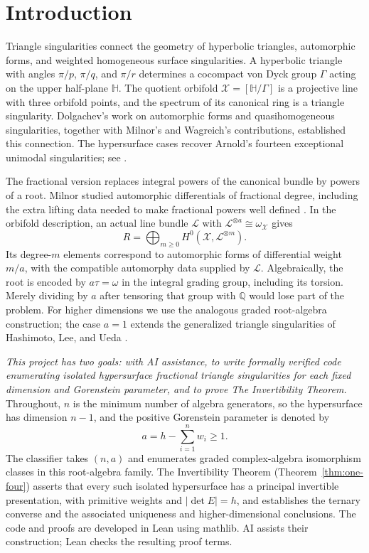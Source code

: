 \section*{Introduction}

Triangle singularities connect the geometry of hyperbolic triangles, automorphic forms, and weighted homogeneous surface singularities. A hyperbolic triangle with angles $\pi/p$, $\pi/q$, and $\pi/r$ determines a cocompact von Dyck group $\Gamma$ acting on the upper half-plane $\mathbb H$. The quotient orbifold $\mathcal X=[\mathbb H/\Gamma]$ is a projective line with three orbifold points, and the spectrum of its canonical ring is a triangle singularity. Dolgachev's work on automorphic forms and quasihomogeneous singularities, together with Milnor's and Wagreich's contributions, established this connection. The hypersurface cases recover Arnold's fourteen exceptional unimodal singularities; see \cite{Dolgachev,Milnor,Wagreich,HLU}.

The fractional version replaces integral powers of the canonical bundle by powers of a root. Milnor studied automorphic differentials of fractional degree, including the extra lifting data needed to make fractional powers well defined \cite[Sections 5--6]{Milnor}. In the orbifold description, an actual line bundle $\mathcal L$ with $\mathcal L^{\otimes a}\cong\omega_{\mathcal X}$ gives
\[
 R=\bigoplus_{m\geq0}H^0(\mathcal X,\mathcal L^{\otimes m}).
\]
Its degree-$m$ elements correspond to automorphic forms of differential weight $m/a$, with the compatible automorphy data supplied by $\mathcal L$. Algebraically, the root is encoded by $a\tau=\omega$ in the integral grading group, including its torsion. Merely dividing by $a$ after tensoring that group with $\mathbb Q$ would lose part of the problem. For higher dimensions we use the analogous graded root-algebra construction; the case $a=1$ extends the generalized triangle singularities of Hashimoto, Lee, and Ueda \cite{HLU}.

\emph{This project has two goals: with AI assistance, to write formally verified code enumerating isolated hypersurface fractional triangle singularities for each fixed dimension and Gorenstein parameter, and to prove The Invertibility Theorem.} Throughout, $n$ is the minimum number of algebra generators, so the hypersurface has dimension $n-1$, and the positive Gorenstein parameter is denoted by
\[
 a=h-\sum_{i=1}^{n}w_i\geq1.
\]
The classifier takes $(n,a)$ and enumerates graded complex-algebra isomorphism classes in this root-algebra family. The Invertibility Theorem (Theorem~\ref{thm:one-four}) asserts that every such isolated hypersurface has a principal invertible presentation, with primitive weights and $|\det E|=h$, and establishes the ternary converse and the associated uniqueness and higher-dimensional conclusions. The code and proofs are developed in Lean using mathlib. AI assists their construction; Lean checks the resulting proof terms.

